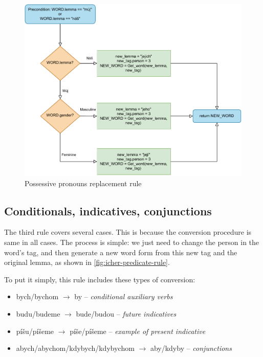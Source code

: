 \begin{figure}[ht!]
\includegraphics[width=\textwidth]{data/Icher-Posspron-Rule.pdf}
\caption{Possessive pronouns replacement rule}
\label{fig:icher-posspron-rule}
\end{figure}

\subsection{Conditionals, indicatives, conjunctions}

The third rule covers several cases. This is because the conversion procedure is same in all cases. The process is simple: we just need to change the person in the word's tag, and then generate a new word form from this new tag and the original lemma, as shown in \ref{fig:icher-predicate-rule}.

To put it simply, this rule includes these types of conversion:
\begin{itemize}
	\item bych/bychom $\rightarrow$ by -- \emph{conditional auxiliary verbs}
	\item budu/budeme $\rightarrow$ bude/budou -- \emph{future indicatives}
	\item píšu/píšeme $\rightarrow$ píše/píšeme -- \emph{example of present indicative}
	\item abych/abychom/kdybych/kdybychom $\rightarrow$ aby/kdyby -- \emph{conjunctions}
\end{itemize}


